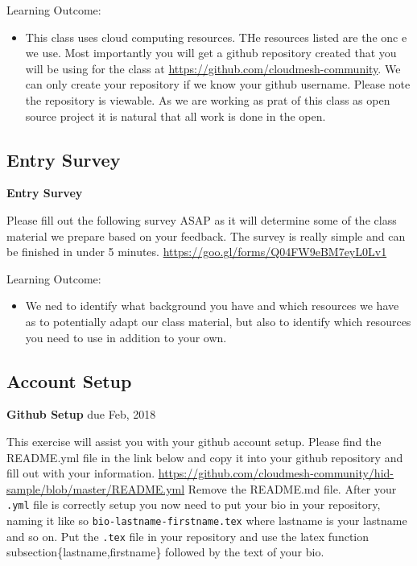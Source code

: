 Learning Outcome:
\begin{itemize}
\item This class uses cloud computing resources. THe resources listed
  are the onc e we use. Most importantly you will get a github
  repository created that you will be using for the class at
  \url{https://github.com/cloudmesh-community}. We can only create
  your repository if we know your github username. Please note the
  repository is viewable. As we are working as prat of this class as
  open source project it is natural that all work is done in the open.
\end{itemize}


\subsection{Entry Survey}
\begin{exercise}
    {\bf Entry Survey}
    
 Please fill out the following survey ASAP as it will determine some
 of the class material we prepare based on your feedback. The survey
 is really simple and can be finished in under 5
 minutes. \url{https://goo.gl/forms/Q04FW9eBM7eyL0Lv1}

\end{exercise}

Learning Outcome:
\begin{itemize}
\item We ned to identify what background you have and which resources
  we have as to potentially adapt our class material, but also to
  identify which resources you need to use in addition to your own.
\end{itemize}


\subsection{Account Setup}

\begin{exercise} {\bf Github Setup} due Feb, 2018

This exercise will assist you with your github account setup. Please
find the README.yml file in the link below and copy it into your
github repository and fill out with your
information. \url{https://github.com/cloudmesh-community/hid-sample/blob/master/README.yml}
Remove the README.md file. After your \verb|.yml| file is correctly setup you
now need to put your bio in your repository, naming it like so
\verb|bio-lastname-firstname.tex| where lastname is your lastname and so
on. Put the \verb|.tex| file in your repository and use the latex function
subsection\{lastname,firstname\} followed by the text of your bio.

\end{exercise}

